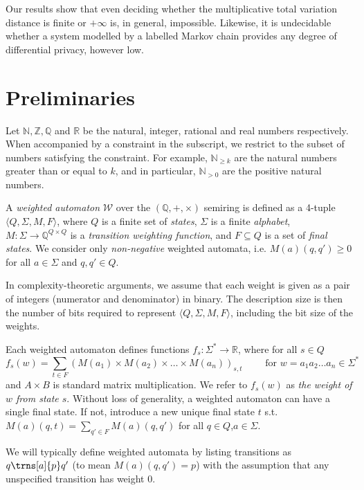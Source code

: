 \documentclass{lmcs}
\theoremstyle{plain}
\theoremstyle{definition}
\theoremstyle{remark}
\newcommand\abra[1]{\langle #1 \rangle}
\newcommand\pbra[1]{\left( #1 \right)}
\newcommand\wa{\mathcal{W}}
\renewcommand\nu{f}
\begin{document}
Our results show that even deciding whether the multiplicative total variation distance
is finite or $+\infty$ is, in general, impossible.
Likewise, it is undecidable whether a system modelled by a labelled Markov chain provides any degree of differential privacy, however low.

\section{Preliminaries}\label{sec:prelims}

Let $\mathbb{N},\mathbb{Z},\mathbb{Q}$ and $\mathbb{R}$ be the natural, integer, rational and real numbers respectively. When accompanied by a constraint in the subscript, we restrict to the subset of numbers satisfying the constraint. For example, $\mathbb{N}_{\ge k}$ are the natural numbers greater than or equal to $k$, and in particular, $\mathbb{N}_{>0}$ are the positive natural numbers.

\begin{defi}
A \emph{weighted automaton} $\wa$ over the $(\mathbb{Q},{+},{\times})$ semiring is defined as
a 4-tuple $\abra{Q, \Sigma{}, M, F}$, where
$Q$ is a finite set of \emph{states},
$\Sigma$ is a finite \emph{alphabet},
$M: \Sigma{} \to \mathbb{Q}^{Q\times Q}$ is a \emph{transition weighting function},
and $F \subseteq Q$ is a set of \emph{final states}.
We consider only \textit{non-negative} weighted automata, i.e. $M(a)(q,q') \ge 0$ for all $a\in \Sigma$ and $q,q' \in Q$.
\end{defi}
In complexity-theoretic arguments, we assume that each weight is given as a pair of integers (numerator and denominator) in binary.
The description size is then the number of bits required to represent $\abra{Q,\Sigma,M, F}$, including the bit size of the weights.

Each weighted automaton defines functions $\nu_s: \Sigma^* \to \mathbb{R}$, where for all $s\in Q$
\[\nu_s(w) = \sum_{t\in F} \pbra{M(a_1)\times M(a_2)\times \dots \times M(a_n)}_{s,t}
\qquad\text{ for  $w= a_1a_2\dots a_n\in\Sigma^\ast$ }
\]
and
$A\times B$ is standard matrix multiplication. We refer to $\nu_s(w)$ as \emph{the weight of $w$ from state $s$}.
Without loss of generality, a weighted automaton can have a single final state. If not,  introduce a new unique final state
$t$ s.t.\ $M(a)(q,t) = \sum_{q'\in F} M(a)(q,q')$ for all $q\in Q$,$a\in \Sigma$.

We will typically define weighted automata by listing transitions as $q\trns[a]{p}q'$ (to mean $M(a)(q,q') = p$) with the assumption that any unspecified transition has weight $0$.
\end{document}
